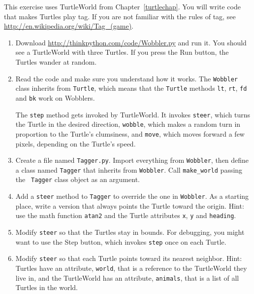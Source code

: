 \documentclass[10pt]{book}
\begin{document}
\begin{exercise}

This exercise uses TurtleWorld from Chapter~\ref{turtlechap}.
You will write code that makes Turtles play tag.  If you
are not familiar with the rules of tag, see
\url{http://en.wikipedia.org/wiki/Tag_(game)}.

\begin{enumerate}

\item Download \url{http://thinkpython.com/code/Wobbler.py} and run it.  You
should see a TurtleWorld with three Turtles.  If you press the
{\sf Run} button, the Turtles wander at random.

\item Read the code and make sure you understand how it works.
The {\tt Wobbler} class inherits from {\tt Turtle}, which means
that the {\tt Turtle} methods {\tt lt}, {\tt rt}, {\tt fd}
and {\tt bk} work on Wobblers.

The {\tt step} method gets invoked by TurtleWorld.  It invokes 
{\tt steer}, which turns the Turtle in the desired direction,
{\tt wobble}, which makes a random turn in proportion to the Turtle's
clumsiness, and {\tt move}, which moves forward a few pixels,
depending on the Turtle's speed.

\item Create a file named {\tt Tagger.py}.  Import everything from
  {\tt Wobbler}, then define a class named {\tt Tagger} that inherits
  from {\tt Wobbler}.  Call \verb"make_world" passing the {\tt
    Tagger} class object as an argument.

\item Add a {\tt steer} method to {\tt Tagger} to override the one in
  {\tt Wobbler}.  As a starting place, write a version that always
  points the Turtle toward the origin.  Hint: use the math function
  {\tt atan2} and the Turtle attributes {\tt x}, {\tt y} and
  {\tt heading}.

\item Modify {\tt steer} so that the Turtles stay in bounds.
  For debugging, you might want to use the {\sf Step} button,
  which invokes {\tt step} once on each Turtle.

\item Modify {\tt steer} so that each Turtle points toward its nearest
  neighbor.  Hint: Turtles have an attribute, {\tt world}, that is a
  reference to the TurtleWorld they live in, and the TurtleWorld has
  an attribute, {\tt animals}, that is a list of all Turtles in the
  world.


\end{enumerate}
\end{exercise}
\end{document}
